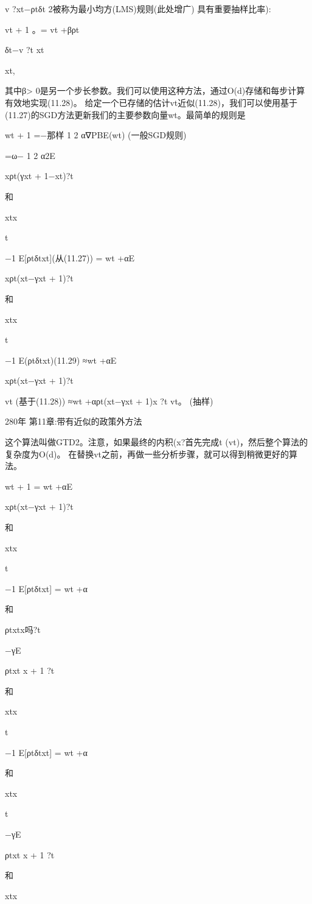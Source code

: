 v ?xt−ρtδt
2被称为最小均方(LMS)规则(此处增广)
具有重要抽样比率):

vt + 1
。= vt +βρt

δt−v ?t xt

xt,

其中β> 0是另一个步长参数。我们可以使用这种方法，通过O(d)存储和每步计算有效地实现(11.28)。
给定一个已存储的估计vt近似(11.28)，我们可以使用基于(11.27)的SGD方法更新我们的主要参数向量wt。最简单的规则是

wt + 1 =−那样
1 2
α∇PBE(wt) 					(一般SGD规则)

=ω−
1 2
α2E

xρt(γxt + 1−xt)?t

和

xtx

t

−1 E[ρtδtxt](从(11.27))
= wt +αE

xρt(xt−γxt + 1)?t

和

xtx

t

−1 E(ρtδtxt)(11.29)
≈wt +αE

xρt(xt−γxt + 1)?t

vt 					(基于(11.28))
≈wt +αρt(xt−γxt + 1)x ?t vt。 					(抽样)

280年 					第11章:带有近似的政策外方法


这个算法叫做GTD2。注意，如果最终的内积(x?首先完成t (vt)，然后整个算法的复杂度为O(d)。
在替换vt之前，再做一些分析步骤，就可以得到稍微更好的算法。

wt + 1 = wt +αE

xρt(xt−γxt + 1)?t

和

xtx

t

−1 E[ρtδtxt]
= wt +α

和

ρtxtx吗?t

−γE

ρtxt x + 1 ?t

和

xtx

t

−1 E[ρtδtxt]
= wt +α

和

xtx

t

−γE

ρtxt x + 1 ?t

和

xtx


